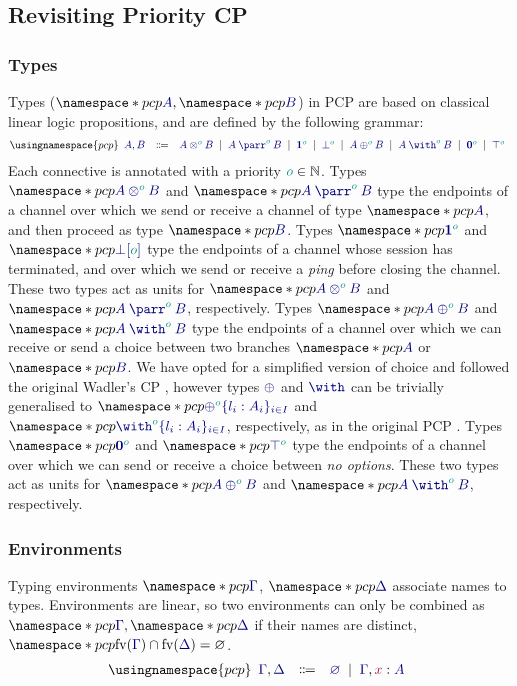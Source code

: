 \subsection{Revisiting Priority CP}

\subsubsection*{Types}
Types ($\pcp{\ty{A}}, \pcp{\ty{B}}$) in PCP are based on classical linear logic propositions, and are defined by the following grammar:
\[
  \usingnamespace{pcp}
  \begin{array}{lcl}
    \ty{A}, \ty{B}
    & \Coloneqq & \ty{\tytens[\cs{o}]{A}{B}}
      \sep        \ty{\typarr[\cs{o}]{A}{B}}
      \sep        \ty{\tyone[\cs{o}]}
      \sep        \ty{\tybot[\cs{o}]}
      \sep        \ty{\typlus[\cs{o}]{A}{B}}
      \sep        \ty{\tywith[\cs{o}]{A}{B}}
      \sep        \ty{\tynil[\cs{o}]}
      \sep        \ty{\tytop[\cs{o}]}
  \end{array}
\]
Each connective is annotated with a priority $\cs{o}\in\mathbb{N}$.
Types $\pcp{\ty{\tytens[\cs{o}]{A}{B}}}$ and $\pcp{\ty{\typarr[\cs{o}]{A}{B}}}$ type the endpoints of a channel over which we send or receive a channel of type $\pcp{\ty{A}}$, and then proceed as type $\pcp{\ty{B}}$. Types $\pcp{\ty{\tyone[\cs{o}]}}$ and $\pcp{\ty{{\tybot}[\cs{o}]}}$ type the endpoints of a channel whose session has terminated, and over which we send or receive a \emph{ping} before closing the channel. These two types act as units for $\pcp{\ty{\tytens[\cs{o}]{A}{B}}}$ and $\pcp{\ty{\typarr[\cs{o}]{A}{B}}}$, respectively.
Types $\pcp{\ty{\typlus[\cs{o}]{A}{B}}}$ and $\pcp{\ty{\tywith[\cs{o}]{A}{B}}}$ type the endpoints of a channel over which we can receive or send a choice between two branches $\pcp{\ty{A}}$ or $\pcp{\ty{B}}$. We have opted for a simplified version of choice and followed the original Wadler's CP \cite{wadler14}, however types $\ty{\oplus}$ and $\ty{\with}$ can be trivially generalised to $\pcp{\ty{\oplus^{\cs{o}}\{l_i:A_i\}_{i\in I}}}$ and $\pcp{\ty{\with^{\cs{o}}\{l_i:A_i\}_{i\in I}}}$, respectively, as in the original PCP \cite{dardhagay18}.
Types $\pcp{\ty{\tynil[\cs{o}]}}$ and $\pcp{\ty{\tytop[\cs{o}]}}$ type the endpoints of a channel over which we can send or receive a choice between \emph{no options}. These two types act as units for $\pcp{\ty{\typlus[\cs{o}]{A}{B}}}$ and $\pcp{\ty{\tywith[\cs{o}]{A}{B}}}$, respectively.

\subsubsection*{Environments}
\label{sec:pcp-environments}
Typing environments $\pcp{\ty{\Gamma}}$, $\pcp{\ty{\Delta}}$ associate names to types. Environments are linear, so two environments can only be combined as $\pcp{\ty{\Gamma}}, \pcp{\ty{\Delta}}$ if their names are distinct, \ie $\pcp{\fv(\ty{\Gamma})\cap\fv(\ty{\Delta})=\varnothing}$.
\[
  \usingnamespace{pcp}
  \begin{array}{lcl}
    \ty{\Gamma}, \ty{\Delta}
    & \Coloneqq & \ty{\emptyenv}
      \sep        \ty{\Gamma}, \tmty{x}{A}
  \end{array}
\]

